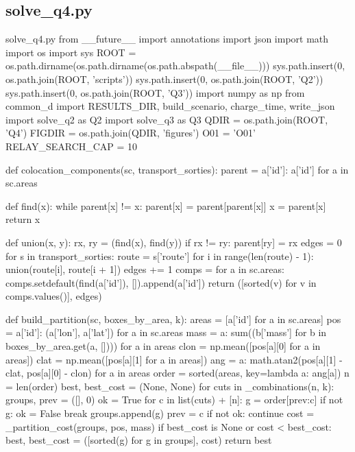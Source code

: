\documentclass[bwprint]{gmcmthesis}
\begin{document}
\begin{appendices}
\subsection{solve\_q4.py}

\begin{Python}{solve\_q4.py}
from __future__ import annotations
import json
import math
import os
import sys
ROOT = os.path.dirname(os.path.dirname(os.path.abspath(__file__)))
sys.path.insert(0, os.path.join(ROOT, 'scripts'))
sys.path.insert(0, os.path.join(ROOT, 'Q2'))
sys.path.insert(0, os.path.join(ROOT, 'Q3'))
import numpy as np
from common_d import RESULTS_DIR, build_scenario, charge_time, write_json
import solve_q2 as Q2
import solve_q3 as Q3
QDIR = os.path.join(ROOT, 'Q4')
FIGDIR = os.path.join(QDIR, 'figures')
O01 = 'O01'
RELAY_SEARCH_CAP = 10

def colocation_components(sc, transport_sorties):
    parent = {a['id']: a['id'] for a in sc.areas}

    def find(x):
        while parent[x] != x:
            parent[x] = parent[parent[x]]
            x = parent[x]
        return x

    def union(x, y):
        rx, ry = (find(x), find(y))
        if rx != ry:
            parent[ry] = rx
    edges = 0
    for s in transport_sorties:
        route = s['route']
        for i in range(len(route) - 1):
            union(route[i], route[i + 1])
            edges += 1
    comps = {}
    for a in sc.areas:
        comps.setdefault(find(a['id']), []).append(a['id'])
    return ([sorted(v) for v in comps.values()], edges)

def build_partition(sc, boxes_by_area, k):
    areas = [a['id'] for a in sc.areas]
    pos = {a['id']: (a['lon'], a['lat']) for a in sc.areas}
    mass = {a: sum((b['mass'] for b in boxes_by_area.get(a, []))) for a in areas}
    clon = np.mean([pos[a][0] for a in areas])
    clat = np.mean([pos[a][1] for a in areas])
    ang = {a: math.atan2(pos[a][1] - clat, pos[a][0] - clon) for a in areas}
    order = sorted(areas, key=lambda a: ang[a])
    n = len(order)
    best, best_cost = (None, None)
    for cuts in _combinations(n, k):
        groups, prev = ([], 0)
        ok = True
        for c in list(cuts) + [n]:
            g = order[prev:c]
            if not g:
                ok = False
                break
            groups.append(g)
            prev = c
        if not ok:
            continue
        cost = _partition_cost(groups, pos, mass)
        if best_cost is None or cost < best_cost:
            best, best_cost = ([sorted(g) for g in groups], cost)
    return best


\end{Python}
\end{appendices}
\end{document}
